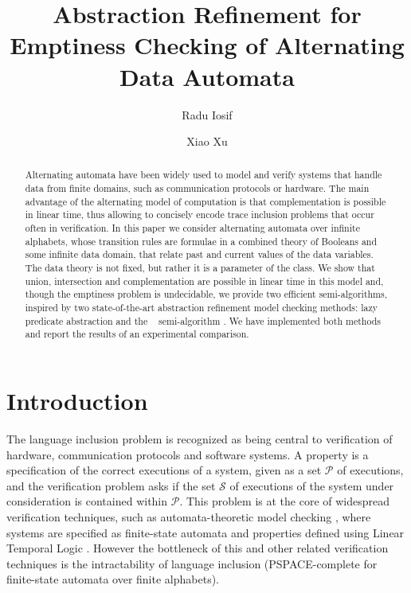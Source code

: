 \documentclass[10pt]{llncs}
\begin{document}

\title{Abstraction Refinement for Emptiness Checking of Alternating
  Data Automata}

\author{Radu Iosif \and Xiao Xu}

\maketitle

\begin{abstract}
Alternating automata have been widely used to model and verify systems
that handle data from finite domains, such as communication protocols
or hardware. The main advantage of the alternating model of
computation is that complementation is possible in linear time, thus
allowing to concisely encode trace inclusion problems that occur often
in verification. In this paper we consider alternating automata over
infinite alphabets, whose transition rules are formulae in a combined
theory of Booleans and some infinite data domain, that relate past and
current values of the data variables. The data theory is not fixed,
but rather it is a parameter of the class. We show that union,
intersection and complementation are possible in linear time in this
model and, though the emptiness problem is undecidable, we provide two
efficient semi-algorithms, inspired by two state-of-the-art
abstraction refinement model checking methods: lazy predicate
abstraction \cite{HJMS02} and the \impact~ semi-algorithm
\cite{mcmillan06}. We have implemented both methods and report the
results of an experimental comparison.
\end{abstract}

\section{Introduction}

The language inclusion problem is recognized as being central to
verification of hardware, communication protocols and software
systems. A property is a specification of the correct executions of a
system, given as a set $\mathcal{P}$ of executions, and the
verification problem asks if the set $\mathcal{S}$ of executions of
the system under consideration is contained within $\mathcal{P}$.
This problem is at the core of widespread verification techniques,
such as automata-theoretic model checking \cite{VARDI94}, where
systems are specified as finite-state automata and properties defined
using Linear Temporal Logic \cite{Pnueli77}. However the bottleneck of
this and other related verification techniques is the intractability
of language inclusion (PSPACE-complete for finite-state automata over
finite alphabets).
\end{document}
